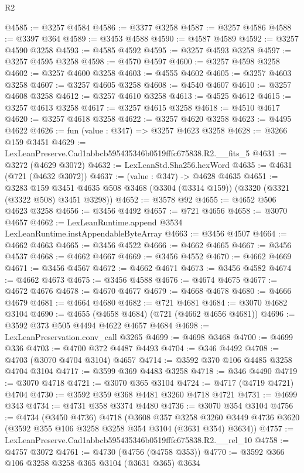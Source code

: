 \begin{lexlean}{R2}
\begin{coremodule}
@4585 := @3257 @4584
@4586 := @3377 @3258
@4587 := @3257 @4586
@4588 := @3397 @364
@4589 := @3453 @4588
@4590 := @4587 @4589
@4592 := @3257 @4590 @3258
@4593 := @4585 @4592
@4595 := @3257 @4593 @3258
@4597 := @3257 @4595 @3258
@4598 := @4570 @4597
@4600 := @3257 @4598 @3258
@4602 := @3257 @4600 @3258
@4603 := @4555 @4602
@4605 := @3257 @4603 @3258
@4607 := @3257 @4605 @3258
@4608 := @4540 @4607
@4610 := @3257 @4608 @3258
@4612 := @3257 @4610 @3258
@4613 := @4525 @4612
@4615 := @3257 @4613 @3258
@4617 := @3257 @4615 @3258
@4618 := @4510 @4617
@4620 := @3257 @4618 @3258
@4622 := @3257 @4620 @3258
@4623 := @4495 @4622
@4626 := fun (value : @347) => @3257 @4623 @3258
@4628 := @3266 @159 @3451
@4629 := LexLeanPreserve.Cad1abbcb595435346b0519fffc675838.R2.__fits_5
@4631 := @3272 (@4629 @3072)
@4632 := LexLeanStd.Sha256.hexWord
@4635 := @4631 (@721 (@4632 @3072))
@4637 := (value : @347) -> @4628 @4635
@4651 := @3283
    @159
    @3451
    @4635
    @508
    @3468
    (@3304 (@3314 @159))
    (@3320 (@3321 (@3322 @508) @3451 @3298))
@4652 := @3578 @92
@4655 := @4652 @506 @4623 @3258
@4656 := @3456 @4492
@4657 := @721 @4656
@4658 := @3070 @4657
@4662 := LexLeanRuntime.append @3534 LexLeanRuntime.instAppendableByteArray
@4663 := @3456 @4507
@4664 := @4662 @4663
@4665 := @3456 @4522
@4666 := @4662 @4665
@4667 := @3456 @4537
@4668 := @4662 @4667
@4669 := @3456 @4552
@4670 := @4662 @4669
@4671 := @3456 @4567
@4672 := @4662 @4671
@4673 := @3456 @4582
@4674 := @4662 @4673
@4675 := @3456 @4588
@4676 := @4674 @4675
@4677 := @4672 @4676
@4678 := @4670 @4677
@4679 := @4668 @4678
@4680 := @4666 @4679
@4681 := @4664 @4680
@4682 := @721 @4681
@4684 := @3070 @4682 @3104
@4690 := @4655 (@4658 @4684) (@721 (@4662 @4656 @4681))
@4696 := @3592 @373 @505 @4494 @4622 @4657 @4684
@4698 := LexLeanPreservation.conv_call @3265
@4699 := @4698 @3468
@4700 := @4699 @336
@4703 := @4700 @372 @4487 @4493
@4704 := @346 @4492
@4708 := @4703 (@3070 @4704 @3104) @4657
@4714 := @3592 @370 @106 @4485 @3258 @4704 @3104
@4717 := @3599 @369 @4483 @3258
@4718 := @346 @4490
@4719 := @3070 @4718
@4721 := @3070 @365 @3104
@4724 := @4717 (@4719 @4721) @4704
@4730 := @3592 @359 @368 @4481 @3260 @4718 @4721
@4731 := @4699 @343
@4734 := @4731 @358 @3374 @4480
@4736 := @3070 @354 @3104
@4756 := @4734
    (@3450 @4736)
    @4718
    (@3608
      @357
      @3258
      @3260
      @3449
      @4736
      @3620
      (@3592 @355 @106 @3258 @3258 @354 @3104 (@3631 @354) @3634))
@4757 := LexLeanPreserve.Cad1abbcb595435346b0519fffc675838.R2.__rel_10
@4758 := @4757 @3072
@4761 := @4730 (@4756 (@4758 @353))
@4770 := @3592 @366 @106 @3258 @3258 @365 @3104 (@3631 @365) @3634

\end{coremodule}
\end{lexlean}
